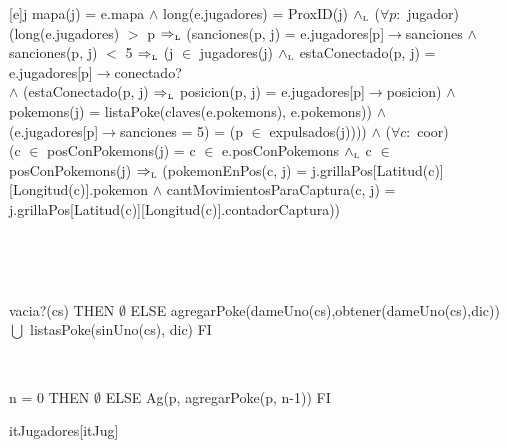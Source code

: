 \begin{Representacion}

	{j}{
		mapa(j) = e.mapa $\land$ long(e.jugadores) = ProxID(j) $\land_{\mathrm{\scriptscriptstyle{L}}}$ ($\forall p:$ jugador) \\
		(long(e.jugadores) $>$ p $\Rightarrow_{\mathrm{\scriptscriptstyle{L}}}$ (sanciones(p, j) = e.jugadores[p]$\rightarrow$sanciones $\land$ \\
		sanciones(p, j) $<$ 5 $\Rightarrow_{\mathrm{\scriptscriptstyle{L}}}$ (j $\in$ jugadores(j) $\land_{\mathrm{\scriptscriptstyle{L}}}$ estaConectado(p, j) = e.jugadores[p]$\rightarrow$conectado? \\
		$\land$ (estaConectado(p, j) $\Rightarrow_{\mathrm{\scriptscriptstyle{L}}}$ posicion(p, j) = e.jugadores[p]$\rightarrow$posicion) $\land$ \\
		pokemons(j) = listaPoke(claves(e.pokemons), e.pokemons)) $\land$ \\
		(e.jugadores[p]$\rightarrow$sanciones = 5) = (p $\in$ expulsados(j)))) $\land$ ($\forall c:$ coor) \\
		(c $\in$ posConPokemons(j) = c $\in$ e.posConPokemons $\land_{\mathrm{\scriptscriptstyle{L}}}$ c $\in$ posConPokemons(j) $\Rightarrow_{\mathrm{\scriptscriptstyle{L}}}$ (pokemonEnPos(c, j) = j.grillaPos[Latitud(c)][Longitud(c)].pokemon $\land$ cantMovimientosParaCaptura(c, j) = j.grillaPos[Latitud(c)][Longitud(c)].contadorCaptura))
	}
	
	~

		 
	~

	{\IF vacia?(cs) THEN
		$\emptyset$
	ELSE
		agregarPoke(dameUno(cs),obtener(dameUno(cs),dic)) $\bigcup$ listasPoke(sinUno(cs), dic)
	FI}
		
	~

	{\IF n = 0 THEN
		$\emptyset$
	ELSE
		Ag(p, agregarPoke(p, n-1))
	FI}



	\begin{Estructura}{itJugadores}[itJug]
		\begin{Tupla}[itJug]
		\end{Tupla}
	\end{Estructura}



\end{Representacion}

